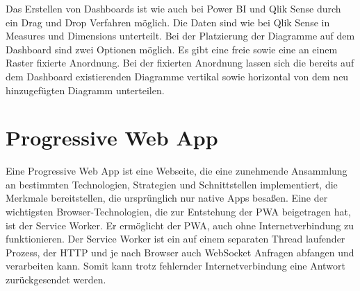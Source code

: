 Das Erstellen von Dashboards ist wie auch bei Power BI und Qlik Sense durch ein Drag und Drop Verfahren möglich.
Die Daten sind wie bei Qlik Sense in Measures und Dimensions unterteilt. Bei der Platzierung der Diagramme auf dem
Dashboard sind zwei Optionen möglich. Es gibt eine freie sowie eine an einem Raster fixierte Anordnung. Bei der fixierten
Anordnung lassen sich die bereits auf dem Dashboard existierenden Diagramme vertikal sowie horizontal von dem neu 
hinzugefügten Diagramm unterteilen. 

\section{Progressive Web App}
\label{sec:progressivewebapp}
Eine Progressive Web App ist eine Webseite, die eine zunehmende Ansammlung an bestimmten Technologien,
Strategien und Schnittstellen implementiert, die Merkmale bereitstellen, die ursprünglich nur
native Apps besaßen.\cite{WikiPWA} Eine der wichtigsten Browser-Technologien, die zur Entstehung der PWA beigetragen hat,
ist der Service Worker. Er ermöglicht der PWA, auch ohne Internetverbindung zu funktionieren. Der 
Service Worker ist ein auf einem separaten Thread laufender Prozess, der HTTP und je nach Browser
auch WebSocket Anfragen abfangen und verarbeiten kann. Somit kann trotz fehlernder Internetverbindung
eine Antwort zurückgesendet werden.\cite{W3ServiceWorker}

